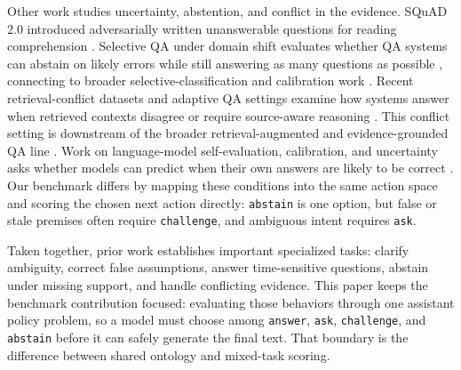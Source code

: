 Other work studies uncertainty, abstention, and conflict in the evidence. SQuAD 2.0 introduced adversarially written unanswerable questions for reading comprehension \citep{rajpurkar-etal-2018-know}. Selective QA under domain shift evaluates whether QA systems can abstain on likely errors while still answering as many questions as possible \citep{kamath-etal-2020-selective}, connecting to broader selective-classification and calibration work \citep{geifman-el-yaniv-2017-selective,guo-etal-2017-calibration}. Recent retrieval-conflict datasets and adaptive QA settings examine how systems answer when retrieved contexts disagree or require source-aware reasoning \citep{shaier-etal-2024-adaptive,liu-etal-2025-open}. This conflict setting is downstream of the broader retrieval-augmented and evidence-grounded QA line \citep{guu-etal-2020-realm,lewis-etal-2020-rag,izacard-grave-2021-fid,nakano-etal-2021-webgpt,menick-etal-2022-quotes}. Work on language-model self-evaluation, calibration, and uncertainty asks whether models can predict when their own answers are likely to be correct \citep{kadavath-etal-2022-language,manakul-etal-2023-selfcheckgpt,kuhn-etal-2023-semantic}. Our benchmark differs by mapping these conditions into the same action space and scoring the chosen next action directly: \texttt{abstain} is one option, but false or stale premises often require \texttt{challenge}, and ambiguous intent requires \texttt{ask}.

Taken together, prior work establishes important specialized tasks: clarify ambiguity, correct false assumptions, answer time-sensitive questions, abstain under missing support, and handle conflicting evidence. This paper keeps the benchmark contribution focused: evaluating those behaviors through one assistant policy problem, so a model must choose among \texttt{answer}, \texttt{ask}, \texttt{challenge}, and \texttt{abstain} before it can safely generate the final text. That boundary is the difference between shared ontology and mixed-task scoring.
